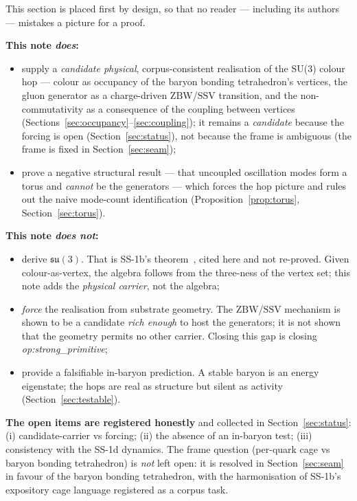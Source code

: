 \documentclass[11pt,a4paper]{article}
\newcommand{\SSV}{\mathrm{SSV}}
\newcommand{\ZBW}{\mathrm{ZBW}}
\begin{document}
This section is placed first by design, so that no reader --- including its
authors --- mistakes a picture for a proof.

\medskip
\noindent\textbf{This note \emph{does}:}
\begin{itemize}
\item supply a \emph{candidate physical}, corpus-consistent realisation of the SU(3)
colour hop --- colour as occupancy of the baryon bonding tetrahedron's vertices,
the gluon generator as a charge-driven $\ZBW$/$\SSV$ transition, and the
non-commutativity as a consequence of the coupling between vertices
(Sections~\ref{sec:occupancy}--\ref{sec:coupling}); it remains a \emph{candidate}
because the forcing is open (Section~\ref{sec:status}), not because the frame is
ambiguous (the frame is fixed in Section~\ref{sec:seam});
\item prove a negative structural result --- that uncoupled oscillation modes
form a torus and \emph{cannot} be the generators --- which forces the hop
picture and rules out the naive mode-count identification
(Proposition~\ref{prop:torus}, Section~\ref{sec:torus}).
\end{itemize}

\medskip
\noindent\textbf{This note \emph{does not}:}
\begin{itemize}
\item derive $\mathfrak{su}(3)$. That is SS-1b's theorem~\citep{ss1b}, cited
here and not re-proved. Given colour-as-vertex, the algebra follows from the
three-ness of the vertex set; this note adds the \emph{physical carrier}, not
the algebra;
\item \emph{force} the realisation from substrate geometry. The $\ZBW$/$\SSV$
mechanism is shown to be a candidate \emph{rich enough} to host the generators;
it is not shown that the geometry permits no other carrier. Closing this gap is
closing \emph{op:strong\_primitive};
\item provide a falsifiable in-baryon prediction. A stable baryon is an
energy eigenstate; the hops are real as structure but silent as activity
(Section~\ref{sec:testable}).
\end{itemize}

\medskip
\noindent\textbf{The open items are registered honestly} and collected in
Section~\ref{sec:status}: (i) candidate-carrier vs forcing; (ii) the absence of
an in-baryon test; (iii) consistency with the SS-1d dynamics. The frame question
(per-quark cage vs baryon bonding tetrahedron) is \emph{not} left open: it is
resolved in Section~\ref{sec:seam} in favour of the baryon bonding tetrahedron,
with the harmonisation of SS-1b's expository cage language registered as a corpus
task.
\end{document}
